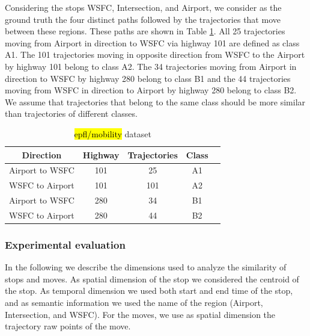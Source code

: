 \documentclass[12pt]{article}
\begin{document}
Considering the stops WSFC, Intersection, and Airport, we consider as the ground truth the four distinct paths followed by the trajectories that move between these regions. These paths are shown in Table \ref{tab:san_francisco_dataset}. All 25 trajectories moving from Airport in direction to WSFC via highway 101 are defined as class A1. The 101 trajectories moving in opposite direction from WSFC to the Airport by highway 101 belong to class A2. The 34 trajectories moving from Airport in direction to WSFC by highway 280 belong to class B1 and the 44 trajectories moving from WSFC in direction to Airport by highway 280 belong to class B2. We assume that trajectories that belong to the same class should be more similar than trajectories of different classes.

\begin{table}[h]
\scriptsize
  \centering
  \begin{tabular}{|c|c|c|c|c|}
  	\hline
 Direction & Highway & Trajectories & Class \\
  	\hline
 Airport to WSFC & 101 & 25 & A1\\
 WSFC to Airport & 101 & 101 & A2\\
 Airport to WSFC & 280 & 34 & B1\\
 WSFC to Airport & 280 & 44 & B2\\
    \hline
  \end{tabular}
  \caption{\hl{epfl/mobility} dataset}
  \label{tab:san_francisco_dataset}
\end{table}

\subsubsection{Experimental evaluation}

In the following we describe the dimensions used to analyze the similarity of stops and moves. As spatial dimension of the stop we considered the centroid of the stop. As temporal dimension we used both start and end time of the stop, and as semantic information we used the name of the region (Airport, Intersection, and WSFC). For the moves, we use as spatial dimension the trajectory raw points of the move.
\end{document}

